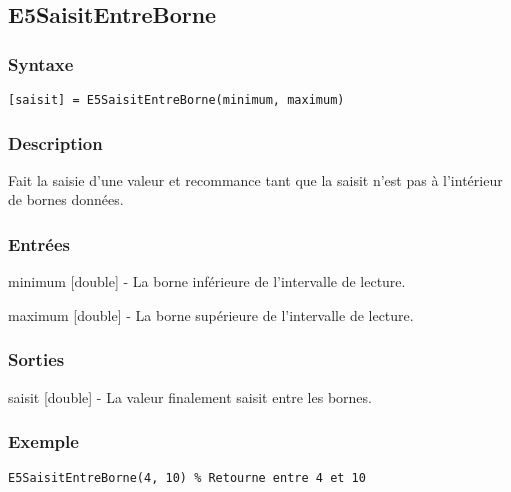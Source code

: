 \begin{minipage}{\linewidth}
\subsection*{E5SaisitEntreBorne}
\subsubsection*{Syntaxe}
\begin{lstlisting}
[saisit] = E5SaisitEntreBorne(minimum, maximum)
\end{lstlisting}
\subsubsection*{Description}
Fait la saisie d'une valeur et recommance tant que la saisit n'est pas à l'intérieur de bornes données.
\subsubsection*{Entrées}
\begin{description}
\item minimum [double] - La borne inférieure de l'intervalle de lecture. 
\item maximum [double] - La borne supérieure de l'intervalle de lecture. 
\end{description} \subsubsection*{Sorties}
\begin{description}
\item saisit [double] - La valeur finalement saisit entre les bornes. 
\end{description} 
\subsubsection*{Exemple}
\begin{lstlisting}
E5SaisitEntreBorne(4, 10) % Retourne entre 4 et 10
\end{lstlisting} \medskip
\end{minipage}